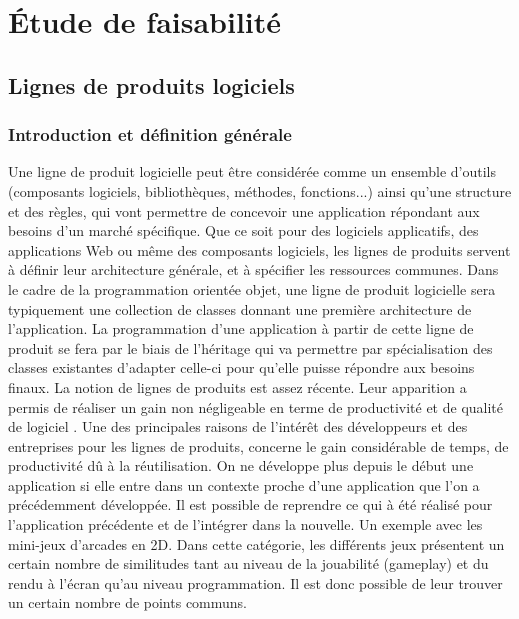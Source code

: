 \documentclass[french,a4paper]{report}
\begin{document}
{\chapter{Étude de faisabilité}
\label{chpfaisabilite}
\section{Lignes de produits logiciels}
\subsection{Introduction et définition générale}
Une ligne de produit logicielle peut être considérée comme un ensemble d'outils (composants logiciels, bibliothèques, méthodes, fonctions...) ainsi qu'une structure et des règles, qui vont permettre de concevoir une application répondant aux besoins d'un marché spécifique.
\newline
Que ce soit pour des logiciels applicatifs, des applications Web ou même des composants logiciels, les lignes de produits servent à définir leur architecture générale, et à spécifier les ressources communes.
\newline
Dans le cadre de la programmation orientée objet, une ligne de produit logicielle sera typiquement une collection de classes donnant une première architecture de l'application. La programmation d'une application à partir de cette ligne de produit se fera par le biais de l'héritage qui va permettre par spécialisation des classes existantes d'adapter celle-ci pour qu'elle puisse répondre aux besoins finaux.
\newline
La notion de lignes de produits est assez récente. Leur apparition a permis de réaliser un gain non négligeable en terme de productivité et de qualité de logiciel \cite{SPLstateart}.
\newline
Une des principales raisons de l'intérêt des développeurs et des entreprises pour les lignes de produits, concerne le gain considérable de temps, de productivité dû à la réutilisation. On ne développe plus depuis le début une application si elle entre dans un contexte proche d'une application que l'on a précédemment développée. Il est possible de reprendre ce qui à été réalisé pour l'application précédente et de l'intégrer dans la nouvelle.
\newline
Un exemple avec les mini-jeux d'arcades en 2D.
Dans cette catégorie, les différents jeux présentent un certain nombre de
similitudes tant au niveau de la jouabilité (gameplay) et du rendu à l'écran qu'au niveau programmation. Il est donc possible de leur trouver un certain nombre de points communs.
}
\end{document}
